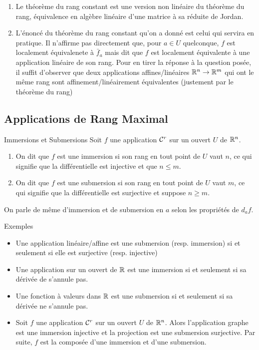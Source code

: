 \documentclass{cours}
\begin{document}
\begin{remarque}{}{}
    \begin{enumerate}
        \item Le théorème du rang constant est une version non linéaire du théorème du rang, équivalence en algèbre linéaire d'une matrice à sa réduite de Jordan.
        \item L'énoncé du théorème du rang constant qu'on a donné est celui qui servira en pratique. Il n'affirme pas directement que, pour $a \in U$ quelconque, $f$ est localement équivalenete à $\bar{f}_{a}$ mais dit que $f$ est localement équivalente à une application linéaire de son rang. Pour en tirer la réponse à la question posée, il suffit d'observer que deux applications affines/linéaires $\mathbb{R}^{n} \to \mathbb{R}^{m}$ qui ont le même rang sont affinement/linéairement équivalentes (justement par le théorème du rang)
    \end{enumerate}
\end{remarque}

\subsection{Applications de Rang Maximal}
\begin{définition}{Immersions et Submersions}{}
    Soit $f$ une application $\mathcal{C}^{r}$ sur un ouvert $U$ de $\mathbb{R}^{n}$.
    \begin{enumerate}
        \item On dit que $f$ est une immersion si son rang en tout point de $U$ vaut $n$, ce qui signifie que la différentielle est injective et que $n \leq m$.
        \item On dit que $f$ est une submersion si son rang en tout point de $U$ vaut $m$, ce qui signifie que la différentielle est surjective et suppose $n \geq m$.
    \end{enumerate}
    On parle de même d'immersion et de submersion en $a$ selon les propriétés de $d_{a}f$.
\end{définition}

\begin{propositionfr}{Exemples}{}
    \begin{itemize}
        \item Une application linéaire/affine est une submersion (resp. immersion) si et seulement si elle est surjective (resp. injective)
        \item Une application sur un ouvert de $\mathbb{R}$ est une immersion si et seulement si sa dérivée de s'annule pas.
        \item Une fonction à valeurs dans $\mathbb{R}$ est une submersion si et seulement si sa dérivée ne s'annule pas. 
        \item Soit $f$ une application $\mathcal{C}^{r}$ sur un ouvert $U$ de $\mathbb{R}^{n}$. Alors l'application graphe est une immersion injective et la projection est une submersion surjective. Par suite, $f$ est la composée d'une immersion et d'une submersion.
    \end{itemize}
\end{propositionfr}
\end{document}
